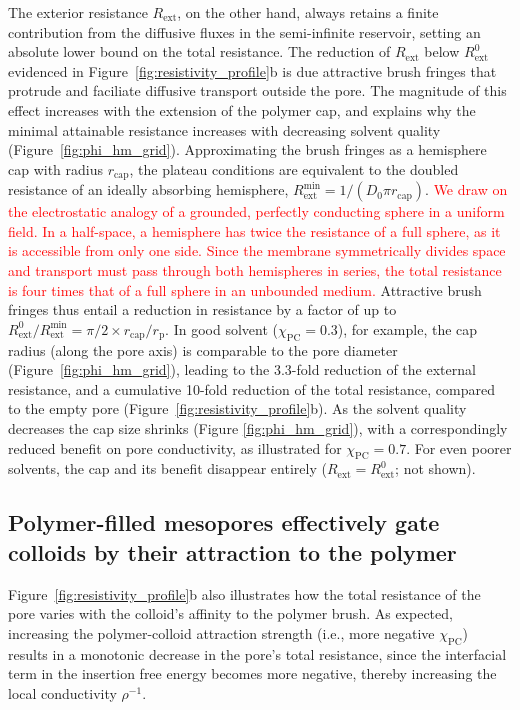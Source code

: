 \documentclass[12pt, a4paper]{article}
\newcommand\todo[1]{\textcolor{red}{#1}}
\begin{document}
The exterior resistance $R_{\text{ext}}$, on the other hand, always retains a finite contribution from the diffusive fluxes in the semi-infinite reservoir, setting an absolute lower bound on the total resistance.
The reduction of $R_{\text{ext}}$ below $R^0_\text{ext}$ evidenced in Figure~\ref{fig:resistivity_profile}b is due attractive brush fringes that protrude and faciliate diffusive transport outside the pore.
The magnitude of this effect increases with the extension of the polymer cap, and explains why the minimal attainable resistance increases with decreasing solvent quality (Figure~\ref{fig:phi_hm_grid}).
Approximating the brush fringes as a hemisphere cap with radius $r_\text{cap}$, the plateau conditions are equivalent to the doubled resistance of an ideally absorbing hemisphere, $R_\text{ext}^\text{min} = 1 / (D_0 \pi r_\text{cap})$.
\todo{We draw on the electrostatic analogy of a grounded, perfectly conducting sphere in a uniform field.
In a half-space, a hemisphere has twice the resistance of a full sphere, as it is accessible from only one side.
Since the membrane symmetrically divides space and transport must pass through both hemispheres in series, the total resistance is four times that of a full sphere in an unbounded medium.}
Attractive brush fringes thus entail a reduction in resistance by a factor of up to $R_\text{ext}^0 / R_\text{ext}^\text{min} = \pi/2 \times r_\text{cap}/r_\text{p}$.
In good solvent ($\chi_\text{PC} = 0.3$), for example, the cap radius (along the pore axis) is comparable to the pore diameter (Figure~\ref{fig:phi_hm_grid}), leading to the 3.3-fold reduction of the external resistance, and a cumulative 10-fold reduction of the total resistance, compared to the empty pore (Figure~\ref{fig:resistivity_profile}b).
As the solvent quality decreases the cap size shrinks (Figure \ref{fig:phi_hm_grid}), with a correspondingly reduced benefit on pore conductivity, as illustrated for $\chi_\text{PC} = 0.7$.
For even poorer solvents, the cap and its benefit disappear entirely ($R_\text{ext} = R_\text{ext}^0$; not shown).


\subsection{Polymer-filled mesopores effectively gate colloids by their attraction to the polymer}

Figure~\ref{fig:resistivity_profile}b also illustrates how the total resistance of the pore varies with the colloid's affinity to the polymer brush.
As expected, increasing the polymer-colloid attraction strength (i.e., more negative $\chi_{\text{PC}}$) results in a monotonic decrease in the pore's total resistance, since the interfacial term in the insertion free energy becomes more negative, thereby increasing the local conductivity $\rho^{-1}$.
\end{document}
